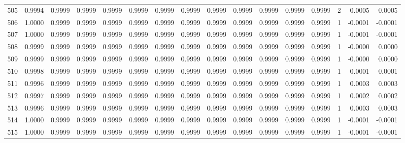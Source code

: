 \begin{tabular}{lrrrrrrrrrrrrrrr}
505 &      0.9994 &  0.9999 &  0.9999 &  0.9999 &  0.9999 &  0.9999 &  0.9999 &  0.9999 &  0.9999 &  0.9999 &   0.9999 &     0.9999 &      2 &                    0.0005 &                     0.0005 \\
506 &      1.0000 &  0.9999 &  0.9999 &  0.9999 &  0.9999 &  0.9999 &  0.9999 &  0.9999 &  0.9999 &  0.9999 &   0.9999 &     0.9999 &      1 &                   -0.0001 &                    -0.0001 \\
507 &      1.0000 &  0.9999 &  0.9999 &  0.9999 &  0.9999 &  0.9999 &  0.9999 &  0.9999 &  0.9999 &  0.9999 &   0.9999 &     0.9999 &      1 &                   -0.0001 &                    -0.0001 \\
508 &      0.9999 &  0.9999 &  0.9999 &  0.9999 &  0.9999 &  0.9999 &  0.9999 &  0.9999 &  0.9999 &  0.9999 &   0.9999 &     0.9999 &      1 &                   -0.0000 &                     0.0000 \\
509 &      0.9999 &  0.9999 &  0.9999 &  0.9999 &  0.9999 &  0.9999 &  0.9999 &  0.9999 &  0.9999 &  0.9999 &   0.9999 &     0.9999 &      1 &                   -0.0000 &                     0.0000 \\
510 &      0.9998 &  0.9999 &  0.9999 &  0.9999 &  0.9999 &  0.9999 &  0.9999 &  0.9999 &  0.9999 &  0.9999 &   0.9999 &     0.9999 &      1 &                    0.0001 &                     0.0001 \\
511 &      0.9996 &  0.9999 &  0.9999 &  0.9999 &  0.9999 &  0.9999 &  0.9999 &  0.9999 &  0.9999 &  0.9999 &   0.9999 &     0.9999 &      1 &                    0.0003 &                     0.0003 \\
512 &      0.9997 &  0.9999 &  0.9999 &  0.9999 &  0.9999 &  0.9999 &  0.9999 &  0.9999 &  0.9999 &  0.9999 &   0.9999 &     0.9999 &      1 &                    0.0002 &                     0.0002 \\
513 &      0.9996 &  0.9999 &  0.9999 &  0.9999 &  0.9999 &  0.9999 &  0.9999 &  0.9999 &  0.9999 &  0.9999 &   0.9999 &     0.9999 &      1 &                    0.0003 &                     0.0003 \\
514 &      1.0000 &  0.9999 &  0.9999 &  0.9999 &  0.9999 &  0.9999 &  0.9999 &  0.9999 &  0.9999 &  0.9999 &   0.9999 &     0.9999 &      1 &                   -0.0001 &                    -0.0001 \\
515 &      1.0000 &  0.9999 &  0.9999 &  0.9999 &  0.9999 &  0.9999 &  0.9999 &  0.9999 &  0.9999 &  0.9999 &   0.9999 &     0.9999 &      1 &                   -0.0001 &                    -0.0001 \\

\end{tabular}
